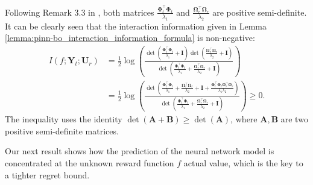 \begin{remark}
    \label{remark:pinn-bo_non_negative_interaction_information}
    Following Remark 3.3 in \citet{wang2022and}, both matrices $\frac{\boldsymbol{\Phi}_t^\top \boldsymbol{\Phi}_t}{\lambda_1}$ and $\frac{\boldsymbol{\Omega}_r^\top \boldsymbol{\Omega}_r}{\lambda_2}$ are positive semi-definite. It can be clearly seen that the interaction information given in Lemma \ref{lemma:pinn-bo_interaction_information_formula} is non-negative:
    \begin{equation*}
    \begin{aligned}
            I (f; \mathbf{Y}_t; \mathbf{U}_r) &= \frac{1}{2}  \log (\frac{\det(\frac{\boldsymbol{\Phi}_t^\top \boldsymbol{\Phi}_t}{\lambda_1} + \mathbf{I})\det(\frac{\boldsymbol{\Omega}_r^\top \boldsymbol{\Omega}_r}{\lambda_2} + \mathbf{I})}{\det(\frac{\boldsymbol{\Phi}_t^\top \boldsymbol{\Phi}_t}{\lambda_1} + \frac{\boldsymbol{\Omega}_r^\top \boldsymbol{\Omega}_r}{\lambda_2} + \mathbf{I})}) \\
            &= \frac{1}{2}  \log (\frac{\det(\frac{\boldsymbol{\Phi}_t^\top \boldsymbol{\Phi}_t}{\lambda_1} + \frac{\boldsymbol{\Omega}_r^\top \boldsymbol{\Omega}_r}{\lambda_2}  + \mathbf{I} + \frac{\boldsymbol{\Phi}_t^\top \boldsymbol{\Phi}_t \boldsymbol{\Omega}_r^\top \boldsymbol{\Omega}_r}{\lambda_1 \lambda_2})}{\det(\frac{\boldsymbol{\Phi}_t^\top \boldsymbol{\Phi}_t}{\lambda_1} + \frac{\boldsymbol{\Omega}_r^\top \boldsymbol{\Omega}_r}{\lambda_2} + \mathbf{I})}) \ge 0.
        \end{aligned}
    \end{equation*}
    The inequality uses the identity $\det(\mathbf{A}+ \mathbf{B}) \ge \det(\mathbf{A})$, where $\mathbf{A},\mathbf{B}$ are two positive semi-definite matrices. 
\end{remark}
Our next result shows how the prediction of the neural network model is concentrated at the unknown reward function $f$ actual value, which is the key to a tighter regret bound.

